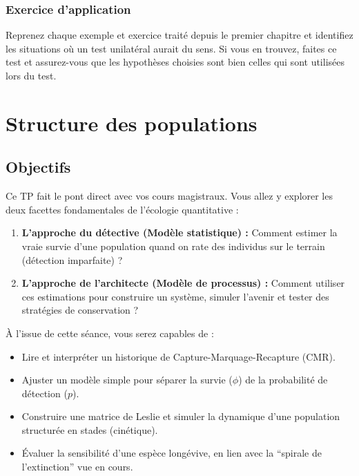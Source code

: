 \documentclass[
  french,
  a4paper,
  DIV=11,
  numbers=noendperiod,
  oneside]{scrreprt}
\begin{document}
\subsection{Exercice d'application}\label{exercice-dapplication-1}

Reprenez chaque exemple et exercice traité depuis le premier chapitre et
identifiez les situations où un test unilatéral aurait du sens. Si vous
en trouvez, faites ce test et assurez-vous que les hypothèses choisies
sont bien celles qui sont utilisées lors du test.


\chapter{Structure des populations}\label{structure-des-populations}

\section{Objectifs}\label{objectifs-1}

Ce TP fait le pont direct avec vos cours magistraux. Vous allez y
explorer les deux facettes fondamentales de l'écologie quantitative :

\begin{enumerate}
\def\labelenumi{\arabic{enumi}.}
\item
  \textbf{L'approche du détective (Modèle statistique) :} Comment
  estimer la vraie survie d'une population quand on rate des individus
  sur le terrain (détection imparfaite) ?
\item
  \textbf{L'approche de l'architecte (Modèle de processus) :} Comment
  utiliser ces estimations pour construire un système, simuler l'avenir
  et tester des stratégies de conservation ?
\end{enumerate}

À l'issue de cette séance, vous serez capables de :

\begin{itemize}
\item
  Lire et interpréter un historique de Capture-Marquage-Recapture (CMR).
\item
  Ajuster un modèle simple pour séparer la survie (\(\phi\)) de la
  probabilité de détection (\(p\)).
\item
  Construire une matrice de Leslie et simuler la dynamique d'une
  population structurée en stades (cinétique).
\item
  Évaluer la sensibilité d'une espèce longévive, en lien avec la
  ``spirale de l'extinction'' vue en cours.
\end{itemize}
\end{document}
